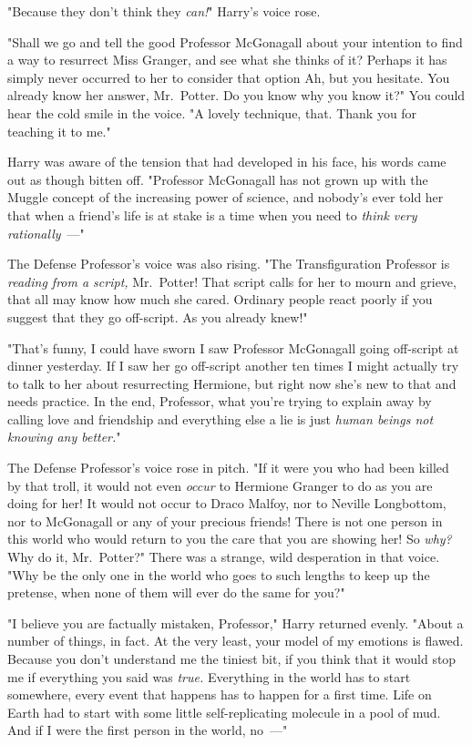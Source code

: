 "Because they don't think they \emph{can!}" Harry's voice rose.

"Shall we go and tell the good Professor McGonagall about your intention to
find a way to resurrect Miss Granger, and see what she thinks of it? Perhaps it
has simply never occurred to her to consider that option{\el} Ah, but you
hesitate. You already know her answer, Mr.~Potter. Do you know why you know
it?" You could hear the cold smile in the voice. "A lovely technique, that.
Thank you for teaching it to me."

Harry was aware of the tension that had developed in his face, his words came
out as though bitten off. "Professor McGonagall has not grown up with the
Muggle concept of the increasing power of science, and nobody's ever told her
that when a friend's life is at stake is a time when you need to \emph{think
very rationally}~---"

The Defense Professor's voice was also rising. "The Transfiguration Professor
is \emph{reading from a script,} Mr.~Potter! That script calls for her to mourn
and grieve, that all may know how much she cared. Ordinary people react poorly
if you suggest that they go off-script. As you already knew!"

"That's funny, I could have sworn I saw Professor McGonagall going off-script
at dinner yesterday. If I saw her go off-script another ten times I might
actually try to talk to her about resurrecting Hermione, but right now she's
new to that and needs practice. In the end, Professor, what you're trying to
explain away by calling love and friendship and everything else a lie is just
\emph{human beings not knowing any better.}"

The Defense Professor's voice rose in pitch. "If it were you who had been
killed by that troll, it would not even \emph{occur} to Hermione Granger to do
as you are doing for her! It would not occur to Draco Malfoy, nor to Neville
Longbottom, nor to McGonagall or any of your precious friends! There is not one
person in this world who would return to you the care that you are showing her!
So \emph{why?} Why do it, Mr.~Potter?" There was a strange, wild desperation in
that voice. "Why be the only one in the world who goes to such lengths to keep
up the pretense, when none of them will ever do the same for you?"

"I believe you are factually mistaken, Professor," Harry returned evenly.
"About a number of things, in fact. At the very least, your model of my
emotions is flawed. Because you don't understand me the tiniest bit, if you
think that it would stop me if everything you said was \emph{true.} Everything
in the world has to start somewhere, every event that happens has to happen for
a first time. Life on Earth had to start with some little self-replicating
molecule in a pool of mud. And if I were the first person in the world, no~---"

